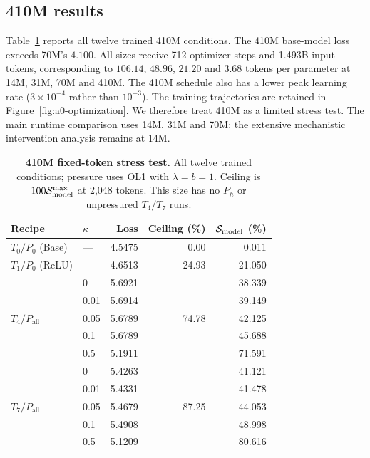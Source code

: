 \subsection{410M results}
\label{app:410m-results}

Table~\ref{tab:endpoints-410m} reports all twelve trained 410M conditions. The 410M base-model loss exceeds 70M's $4.100$. All sizes receive 712 optimizer
steps and 1.493B input tokens, corresponding to $106.14$, $48.96$, $21.20$ and $3.68$
tokens per parameter at 14M, 31M, 70M and 410M. The 410M schedule also has a lower
peak learning rate ($3\times10^{-4}$ rather than $10^{-3}$). The training trajectories are retained in
Figure~\ref{fig:a0-optimization}. We therefore treat 410M as a limited
stress test. The main runtime comparison uses 14M, 31M and 70M; the extensive
mechanistic intervention analysis remains at 14M.

\begin{table}[H]
\centering\small
\setlength{\tabcolsep}{6pt}
\renewcommand{\arraystretch}{1.05}
\caption{\textbf{410M fixed-token stress test.} All twelve trained conditions; pressure uses OL1 with $\lambda=b=1$. Ceiling is $100\mathcal{S}_{\mathrm{model}}^{\max}$ at 2,048 tokens. This size has no $P_h$ or unpressured $T_4/T_7$ runs.}
\label{tab:endpoints-410m}
\begin{tabular}{@{}llrrr@{}}
\toprule
Recipe & $\kappa$ & Loss & Ceiling (\%) & $\mathcal{S}_{\mathrm{model}}$ (\%) \\
\midrule
$T_0/P_{0}$ (Base) & --- & 4.5475 & 0.00 & 0.011 \\
\midrule
$T_1/P_{0}$ (ReLU) & --- & 4.6513 & 24.93 & 21.050 \\
\midrule
\multirow{5}{*}{$T_4/P_{\mathrm{all}}$} & 0 & 5.6921 & \multirow{5}{*}{74.78} & 38.339 \\
 & 0.01 & 5.6914 & & 39.149 \\
 & 0.05 & 5.6789 & & 42.125 \\
 & 0.1 & 5.6789 & & 45.688 \\
 & 0.5 & 5.1911 & & 71.591 \\
\midrule
\multirow{5}{*}{$T_7/P_{\mathrm{all}}$} & 0 & 5.4263 & \multirow{5}{*}{87.25} & 41.121 \\
 & 0.01 & 5.4331 & & 41.478 \\
 & 0.05 & 5.4679 & & 44.053 \\
 & 0.1 & 5.4908 & & 48.998 \\
 & 0.5 & 5.1209 & & 80.616 \\
\bottomrule
\end{tabular}
\end{table}



